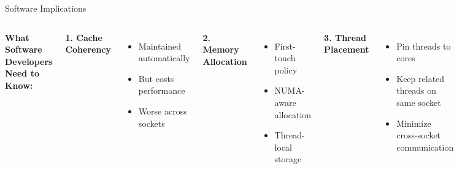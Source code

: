\documentclass[aspectratio=169,12pt]{beamer}
\begin{document}
\begin{frame}{Software Implications}
\begin{columns}[T]
\textbf{What Software Developers Need to Know:}

\vspace{0.2cm}
\textbf{1. Cache Coherency}
\begin{itemize}
\item Maintained automatically
\item But costs performance
\item Worse across sockets
\end{itemize}

\vspace{0.2cm}
\textbf{2. Memory Allocation}
\begin{itemize}
\item First-touch policy
\item NUMA-aware allocation
\item Thread-local storage
\end{itemize}

\vspace{0.2cm}
\textbf{3. Thread Placement}
\begin{itemize}
\item Pin threads to cores
\item Keep related threads on same socket
\item Minimize cross-socket communication
\end{itemize}

\textbf{Performance Tips:}

\begin{enumerate}
\item \textbf{Check your topology:}\\
   \texttt{lscpu -e} or \texttt{lstopo}
   
\item \textbf{Quick improvement:}\\
   \texttt{numactl --cpunodebind=0 ./app}
   
\item \textbf{For shared data:}\\
   Place on socket with most accessors
   
\item \textbf{For partitioned data:}\\
   Align partitions to NUMA nodes
\end{enumerate}

\vspace{0.3cm}
\end{columns}
\end{frame}
\end{document}
